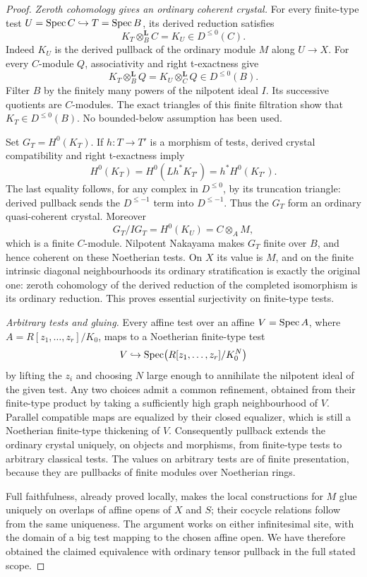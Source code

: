 \begin{proof}
\emph{Zeroth cohomology gives an ordinary coherent crystal.}
For every finite-type test $U=\operatorname{Spec} C\hookrightarrow T=\operatorname{Spec} B$, its derived reduction satisfies
\[
 K_T\otimes_B^{\mathbf L}C=K_U\in D^{\leq0}(C).
\]
Indeed $K_U$ is the derived pullback of the ordinary module $M$ along $U\to X$.  For every $C$-module $Q$, associativity and right t-exactness give
\[
                   K_T\otimes_B^{\mathbf L}Q
                   =K_U\otimes_C^{\mathbf L}Q\in D^{\leq0}(B).
\]
Filter $B$ by the finitely many powers of the nilpotent ideal $I$.  Its successive quotients are $C$-modules.  The exact triangles of this finite filtration show that $K_T\in D^{\leq0}(B)$.  No bounded-below assumption has been used.

Set $G_T=H^0(K_T)$.  If $h:T\to T'$ is a morphism of tests, derived crystal compatibility and right t-exactness imply
\[
 H^0(K_T)=H^0(Lh^*K_{T'})=h^*H^0(K_{T'}).
\]
The last equality follows, for any complex in $D^{\leq0}$, by its truncation triangle: derived pullback sends the $D^{\leq-1}$ term into $D^{\leq-1}$.  Thus the $G_T$ form an ordinary quasi-coherent crystal.  Moreover
\[
          G_T/IG_T=H^0(K_U)=C\otimes_AM,
\]
which is a finite $C$-module.  Nilpotent Nakayama makes $G_T$ finite over $B$, and hence coherent on these Noetherian tests.  On $X$ its value is $M$, and on the finite intrinsic diagonal neighbourhoods its ordinary stratification is exactly the original one: zeroth cohomology of the derived reduction of the completed isomorphism is its ordinary reduction.  This proves essential surjectivity on finite-type tests.

\emph{Arbitrary tests and gluing.}
Every affine test over an affine $V=\operatorname{Spec} A$, where $A=R[z_1,\ldots,z_r]/K_0$, maps to a Noetherian finite-type test
\[
        V\hookrightarrow\operatorname{Spec}\bigl(R[z_1,\ldots,z_r]/K_0^N\bigr)
\]
by lifting the $z_i$ and choosing $N$ large enough to annihilate the nilpotent ideal of the given test.  Any two choices admit a common refinement, obtained from their finite-type product by taking a sufficiently high graph neighbourhood of $V$.  Parallel compatible maps are equalized by their closed equalizer, which is still a Noetherian finite-type thickening of $V$.  Consequently pullback extends the ordinary crystal uniquely, on objects and morphisms, from finite-type tests to arbitrary classical tests.  The values on arbitrary tests are of finite presentation, because they are pullbacks of finite modules over Noetherian rings.

Full faithfulness, already proved locally, makes the local constructions for $M$ glue uniquely on overlaps of affine opens of $X$ and $S$; their cocycle relations follow from the same uniqueness.  The argument works on either infinitesimal site, with the domain of a big test mapping to the chosen affine open.  We have therefore obtained the claimed equivalence with ordinary tensor pullback in the full stated scope.
\end{proof}

